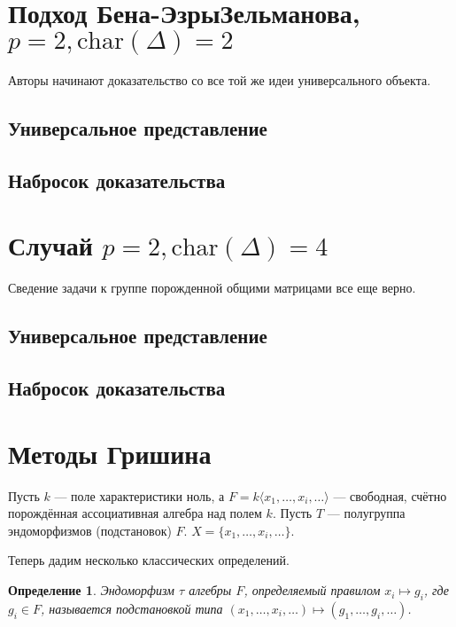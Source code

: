 \documentclass[12pt,a4paper]{article}
\newtheorem{definition}{Определение}[section]
\renewcommand{\char}{\ensuremath{\mathrm{char}}}
\begin{document}
    \section{Подход Бена-Эзры\textemdash Зельманова, $p = 2, \char(\Delta) = 2$}
    Авторы начинают доказательство со все той же идеи универсального объекта.

    \subsection{Универсальное представление}

    \subsection{Набросок доказательства}


    \section{Случай $p=2, \char(\Delta) = 4$}
    Сведение задачи к группе порожденной общими матрицами все еще верно.

    \subsection{Универсальное представление}

    \subsection{Набросок доказательства}


    \section{Методы Гришина}
    Пусть $k$ — поле характеристики ноль, а $F = k\langle x_1, \ldots, x_i, \ldots \rangle$ — свободная, счётно порождённая ассоциативная алгебра над полем $k$.
    Пусть $T$ — полугруппа эндоморфизмов (подстановок) $F$. $X = \{ x_1, \ldots, x_i, \ldots \}$.

    Теперь дадим несколько классических определений.

    \vskip 0.1in\noindent
    \begin{definition}
        Эндоморфизм $\tau$ алгебры $F$, определяемый правилом $x_i \mapsto g_i$, где $g_i \in F$, называется подстановкой типа $(x_1, \ldots, x_i, \ldots) \mapsto (g_1, \ldots, g_i, \ldots)$.
    \end{definition}
    \vskip 0.1in\noindent
\end{document}
